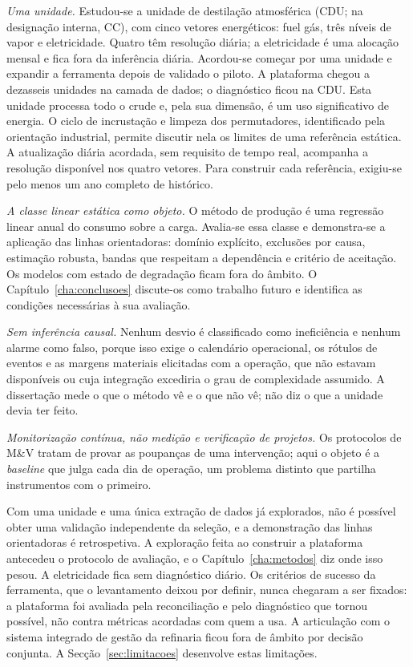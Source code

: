\emph{Uma unidade.} Estudou-se a unidade de destilação atmosférica
(CDU; na designação interna, CC), com cinco vetores energéticos: fuel
gás, três níveis de vapor e eletricidade. Quatro têm resolução diária;
a eletricidade é uma alocação mensal e fica fora da inferência diária.
Acordou-se começar por uma unidade e expandir a ferramenta depois de
validado o piloto. A plataforma chegou a dezasseis unidades na camada
de dados; o diagnóstico ficou na CDU. Esta unidade processa todo o
crude e, pela sua dimensão, é um uso significativo de energia. O ciclo
de incrustação e limpeza dos permutadores, identificado pela orientação
industrial, permite discutir nela os limites de uma referência estática.
A atualização diária acordada, sem requisito de tempo real, acompanha
a resolução disponível nos quatro vetores. Para construir cada
referência, exigiu-se pelo menos um ano completo de histórico.

\emph{A classe linear estática como objeto.} O método de produção é uma
regressão linear anual do consumo sobre a carga. Avalia-se essa classe
e demonstra-se a aplicação das linhas orientadoras: domínio explícito,
exclusões por causa, estimação robusta, bandas que respeitam a
dependência e critério de aceitação. Os modelos com estado de degradação
ficam fora do âmbito. O Capítulo~\ref{cha:conclusoes} discute-os como
trabalho futuro e identifica as condições necessárias à sua avaliação.

\emph{Sem inferência causal.} Nenhum desvio é classificado como
ineficiência e nenhum alarme como falso, porque isso exige o calendário
operacional, os rótulos de eventos e as margens materiais elicitadas
com a operação, que não estavam disponíveis ou cuja integração excediria o grau de complexidade assumido. A dissertação mede o que o
método vê e o que não vê; não diz o que a unidade devia ter feito.

\emph{Monitorização contínua, não medição e verificação de projetos.}
Os protocolos de M\&V tratam de provar as poupanças de uma intervenção;
aqui o objeto é a \emph{baseline} que julga cada dia de operação, um
problema distinto que partilha instrumentos com o primeiro.

 Com uma unidade
e uma única extração de dados já explorados, não é possível obter uma
validação independente da seleção, e a demonstração das linhas orientadoras é
retrospetiva. A exploração feita ao construir a plataforma
antecedeu o protocolo de avaliação, e o Capítulo~\ref{cha:metodos} diz
onde isso pesou. A
eletricidade fica sem diagnóstico diário. Os
critérios de sucesso da ferramenta, que o levantamento deixou por
definir, nunca chegaram a ser fixados: a plataforma foi avaliada pela
reconciliação e pelo diagnóstico que tornou possível, não contra
métricas acordadas com quem a usa. A articulação com o sistema integrado
de gestão da refinaria ficou fora de âmbito por decisão conjunta. A Secção~\ref{sec:limitacoes} desenvolve estas limitações.

